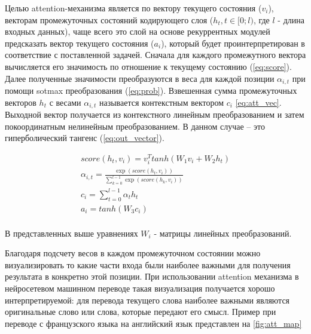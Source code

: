 \documentclass[14pt, a4paper, russian]{report}
\begin{document}
\begin{normalsize}
Целью attention-механизма является по вектору текущего состояния ($v_i$), векторам промежуточных состояний кодирующего слоя ($h_t, t \in [0; l)$, где $l$ - длина входных данных), чаще всего это слой на основе рекуррентных модулей предсказать вектор текущего состояния ($a_i$), который будет проинтерпретирован в соответствие с поставленной задачей. 
Сначала для каждого промежутного вектора вычисляется его значимость по отношение к текущему состоянию (\ref{eq:score}). Далее полученные значимости преобразуются в веса для каждой позиции  $\alpha_{i,t}$ при помощи sotmax преобразования (\ref{eq:prob}). Взвешенная сумма промежуточных векторов $h_t$ с весами $\alpha_{i,t}$ называется контекстным вектором $c_i$ \ref{eq:att_vec}. Выходной вектор получается из контекстного линейным преобразованием и затем покоординатным нелинейным преобразованием. В данном случае -- это гиперболический тангенс (\ref{eq:out_vector}).

\begin{align}
\label{eq:score} score(h_t, v_i) = v_i^Ttanh\left( W_1 v_i + W_2 h_t\right) \\
\label{eq:prob} \alpha_{i,t}=\frac{\exp\left(score\left(h_t,   v_i\right) \right) }{\sum\limits_{k=0} ^{l-1} \exp\left(score\left(h_k,   v_i\right) \right)}\\
\label{eq:att_vec} c_i = \sum\limits_{t=0}^{l-1} \alpha_t h_t \\
\label{eq:out_vector} a_i = tanh\left(W_3 c_i \right)  \\
\end{align}
 
В представленных выше уравнениях $W_i$ - матрицы линейных преобразований.

Благодаря подсчету весов в каждом промежуточном состоянии можно визуализировать то какие части входа были наиболее важными для получения результата в конкретно этой позиции. При использовании attention механизма в нейросетевом машинном переводе такая визуализация получается хорошо интерпретируемой: для перевода текущего слова наиболее важными являются оригинальные слово или слова, которые передают его смысл. Пример при переводе с французского языка на английский язык представлен на \cref{fig:att_map}


\end{normalsize}
\end{document}
